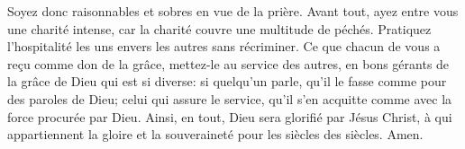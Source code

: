 Soyez donc raisonnables et sobres en vue de la prière.
Avant tout, ayez entre vous une charité intense,
	car la charité couvre une multitude de péchés.
Pratiquez l’hospitalité les uns envers les autres sans récriminer.
Ce que chacun de vous a reçu comme don de la grâce,
	mettez-le au service des autres,
	en bons gérants de la grâce de Dieu qui est si diverse:
	si quelqu’un parle, qu’il le fasse comme pour des paroles de Dieu;
	celui qui assure le service,
		qu’il s’en acquitte comme avec la force procurée par Dieu.
Ainsi, en tout, Dieu sera glorifié par Jésus Christ,
	à qui appartiennent la gloire et la souveraineté
	pour les siècles des siècles. Amen.

